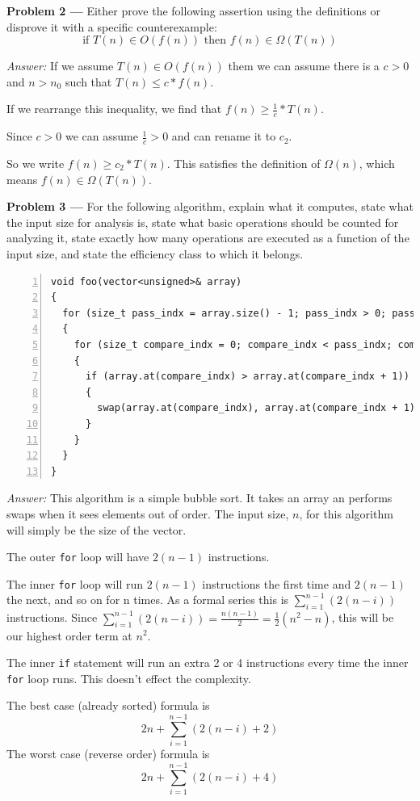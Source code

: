 \documentclass[11pt]{article}
\newcommand{\problem}[1]{\textbf{Problem #1 ---} }
\newcommand{\answer}{\textit{Answer: } }
\begin{document}
\problem{2} Either prove the following assertion using the definitions
or disprove it with a specific counterexample:
\[
\text{if } T(n) \in O(f(n)) \text{ then } f(n) \in \Omega(T(n))
\]

\answer If we assume $T(n) \in O(f(n))$ them we can assume there is a $c > 0$ 
and $n > n_0$ such that $T(n) \leq c*f(n)$.

If we rearrange this inequality, we find that $f(n) \geq \frac{1}{c} * T(n)$.

Since $c > 0$ we can assume $\frac{1}{c} > 0$ and can rename it to $c_2$.

So we write $f(n) \geq c_2 * T(n)$. This satisfies the definition of 
$\Omega(n)$, which means $f(n) \in \Omega(T(n))$.


\problem{3} For the following algorithm, explain what it computes,
state what the input size for analysis is, state what basic operations
should be counted for analyzing it, state exactly how many operations
are executed as a function of the input size, and state the efficiency
class to which it belongs.

\begin{Verbatim}[numbers=left,xleftmargin=5mm]
void foo(vector<unsigned>& array)
{
  for (size_t pass_indx = array.size() - 1; pass_indx > 0; pass_indx--)
  {
    for (size_t compare_indx = 0; compare_indx < pass_indx; compare_indx++)
    {
      if (array.at(compare_indx) > array.at(compare_indx + 1))
      {
        swap(array.at(compare_indx), array.at(compare_indx + 1));
      }
    }
  }
}
\end{Verbatim}

\answer This algorithm is a simple bubble sort. It takes an array an performs 
swaps when it sees elements out of order.
The input size, $n$, for this algorithm will simply be the size of the vector.

The outer \texttt{for} loop will have $2(n-1)$ instructions.

The inner \texttt{for} loop will run $2(n-1)$ instructions the first time and 
$2(n-1)$ the next, and so on for n times. As a formal series this is
$\sum_{i=1}^{n-1} (2(n-i))$ instructions. Since $\sum_{i=1}^{n-1} (2(n-i))
= \frac{n(n-1)}{2} = \frac{1}{2}(n^2-n)$, this will be our highest order term at $n^2$.

The inner \texttt{if} statement will run an extra 2 or 4 instructions every
time the inner \texttt{for} loop runs. This doesn't effect the complexity.

The best case (already sorted) formula is
\[
2n + \sum_{i=1}^{n-1} (2(n-i) + 2)
\]
The worst case (reverse order) formula is
\[
2n + \sum_{i=1}^{n-1} (2(n-i) + 4)
\]
\end{document}
